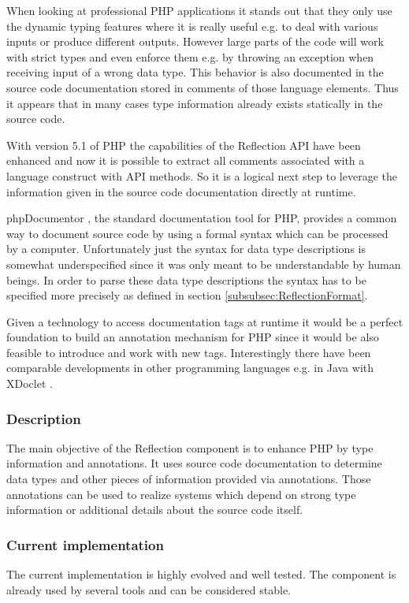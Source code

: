 \documentclass[10pt,final,a4paper,oneside]{article}
\begin{document}
When looking at professional PHP applications
it stands out that they only use the dynamic
typing features 
where it is really useful e.g. to deal with various inputs
or produce different outputs.
However large parts of the code will work with strict
types and even enforce them e.g. by throwing
an exception when receiving input of a wrong data type.
This behavior is also documented in the source code
documentation stored in comments of those language elements.
Thus it appears that in many cases type information
already exists statically in the source code.

With version 5.1 of PHP the capabilities of the Reflection API
have been enhanced and now it is possible to extract all comments
associated with a language construct with API methods.
So it is a logical next step to leverage the information
given in the source code documentation directly at runtime.

phpDocumentor \cite{phpDocumentor}, the standard documentation tool for PHP,
provides a common way to document source code by
using a formal syntax which can be processed by a computer.
Unfortunately just the syntax for data type descriptions
is somewhat underspecified since it was only meant
to be understandable by human beings.
In order to parse these data type descriptions
the syntax has to be specified more precisely
as defined in section \ref{subsubsec:ReflectionFormat}.

Given a technology to access documentation tags
at runtime it would be a perfect foundation
to build an annotation mechanism for PHP
since it would be also feasible to introduce and work with new tags.
Interestingly there have been comparable developments in other
programming languages e.g. in Java with XDoclet \cite{XDoclet}.


\subsubsection{Description}
The main objective of the Reflection component is
to enhance PHP by type information and annotations.
It uses source code documentation to determine
data types and other pieces of information provided
via annotations.
Those annotations can be used to realize systems
which depend on strong type information or
additional details about the source code itself.


\subsubsection{Current implementation}
The current implementation is highly evolved and well tested.
The component is already used by several tools
and can be considered stable.
\end{document}
